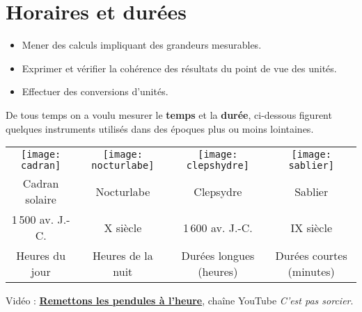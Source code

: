 \themaM
\graphicspath{{../../S07_Horaires_et_durees/Images/}}

\chapter{Horaires et durées}
\label{S07}


\begin{prerequis}
   \begin{itemize}
      \item[\com] Mener des calculs impliquant des grandeurs mesurables.
      \item[\com] Exprimer et vérifier la cohérence des résultats du point de vue des unités.
      \item[\com] Effectuer des conversions d’unités.
   \end{itemize}
\end{prerequis}

\vfill

\begin{debat}
   De tous temps on a voulu mesurer le {\bf temps} et la {\bf durée}, ci-dessous figurent quelques instruments utilisés dans des époques plus ou moins lointaines. \\
   \textcolor{B1}{\small
   \begin{tabular}{*{4}{C{3.5}}}
      \texttt{[image: cadran]}
      &
      \texttt{[image: nocturlabe]}
      &
      \texttt{[image: clepshydre]}
      &
      \texttt{[image: sablier]} \\
      Cadran solaire & Nocturlabe & Clepsydre & Sablier \\
      1\,500 av. J.-C. & X siècle & 1\,600 av. J.-C. & IX siècle \\
      Heures du jour & Heures de la nuit & Durées longues (heures) & Durées courtes (minutes) \\
   \end{tabular}}
   \bigskip
   \begin{cadre}[B2][F4]
      \begin{center}
         Vidéo : \href{https://www.youtube.com/watch?v=8vMTE9U9z0U}{\bf Remettons les pendules à l'heure}, chaîne YouTube {\it C'est pas sorcier}.
      \end{center}
   \end{cadre}
\end{debat}

